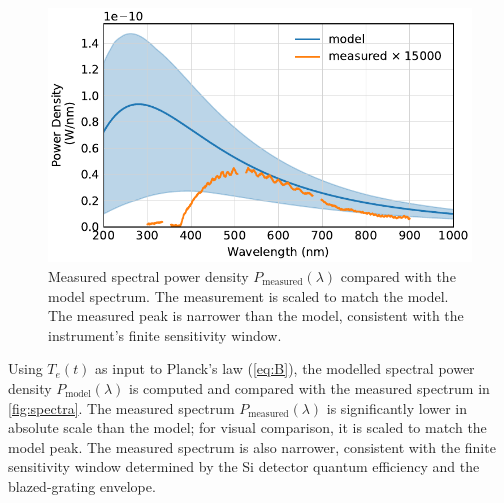 \documentclass[
	parskip=half,
	a4paper,
]{scrarticle}
\begin{document}
\begin{figure}
    \centering
    \includegraphics{../analysis/figures/spectrum de.pdf}
    \caption{Measured spectral power density \(P_\text{measured}(\lambda)\) compared with the model spectrum. The measurement is scaled to match the model. The measured peak is narrower than the model, consistent with the instrument’s finite sensitivity window.}
    \label{fig:spectra}
\end{figure}
Using \(T_e(t)\) as input to Planck’s law (\autoref{eq:B}), the modelled spectral power density \(P_\text{model}(\lambda)\) is computed and compared with the measured spectrum in \autoref{fig:spectra}. The measured spectrum \(P_\text{measured}(\lambda)\) is significantly lower in absolute scale than the model; for visual comparison, it is scaled to match the model peak. The measured spectrum is also narrower, consistent with the finite sensitivity window determined by the Si detector quantum efficiency and the blazed-grating envelope.
\end{document}
